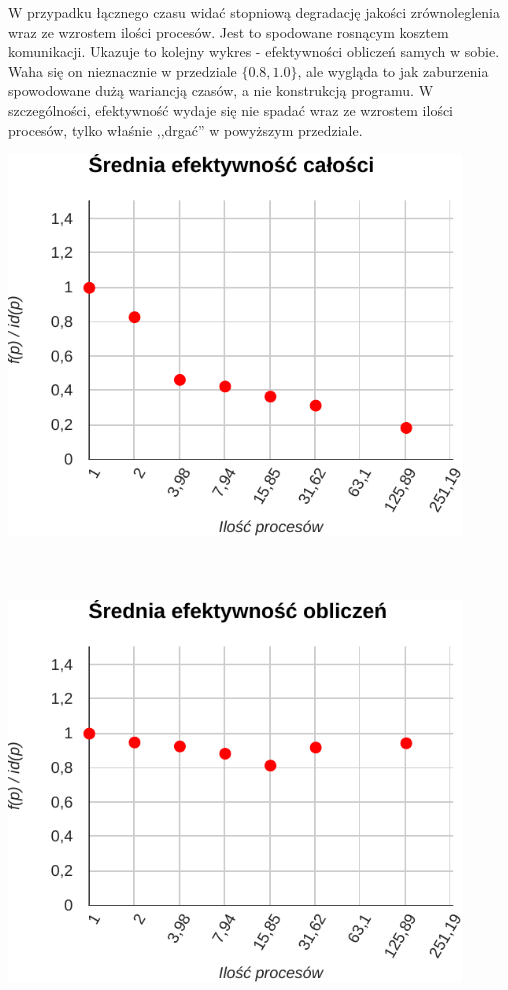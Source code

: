 \documentclass[paper=a4, fontsize=11pt]{scrartcl}	%
\numberwithin{equation}{section}		%
\numberwithin{figure}{section}			%
\numberwithin{table}{section}				%
\begin{document}
W przypadku łącznego czasu widać stopniową degradację jakości zrównoleglenia
wraz ze wzrostem ilości procesów. Jest to spodowane rosnącym kosztem
komunikacji. Ukazuje to kolejny wykres - efektywności obliczeń samych w sobie.
Waha się on nieznacznie w przedziale $\{0.8, 1.0\}$, ale wygląda to jak
zaburzenia spowodowane dużą wariancją czasów, a nie konstrukcją programu. W
szczególności, efektywność wydaje się nie spadać wraz ze wzrostem ilości
procesów, tylko właśnie ,,drgać'' w powyższym przedziale.

\includegraphics[width=120mm]{report/eff-whole.pdf} \\ \ \\ \ \\ \ \\

\includegraphics[width=120mm]{report/comp-eff-whole.pdf} \\ \ \\ \ \\ \ \\
\end{document}
